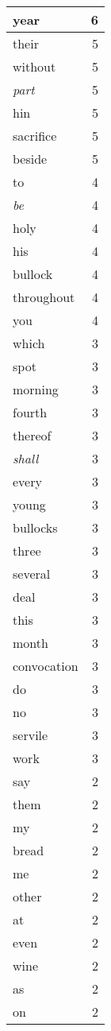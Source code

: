 \begin{center}
\begin{longtable}{l|r}
year & 6\\ \hline 
their & 5\\ \hline 
without & 5\\ \hline 
\emph{part} & 5\\ \hline 
hin & 5\\ \hline 
sacrifice & 5\\ \hline 
beside & 5\\ \hline 
to & 4\\ \hline 
\emph{be} & 4\\ \hline 
holy & 4\\ \hline 
his & 4\\ \hline 
bullock & 4\\ \hline 
throughout & 4\\ \hline 
you & 4\\ \hline 
which & 3\\ \hline 
spot & 3\\ \hline 
morning & 3\\ \hline 
fourth & 3\\ \hline 
thereof & 3\\ \hline 
\emph{shall} & 3\\ \hline 
every & 3\\ \hline 
young & 3\\ \hline 
bullocks & 3\\ \hline 
three & 3\\ \hline 
several & 3\\ \hline 
deal & 3\\ \hline 
this & 3\\ \hline 
month & 3\\ \hline 
convocation & 3\\ \hline 
do & 3\\ \hline 
no & 3\\ \hline 
servile & 3\\ \hline 
work & 3\\ \hline 
say & 2\\ \hline 
them & 2\\ \hline 
my & 2\\ \hline 
bread & 2\\ \hline 
me & 2\\ \hline 
other & 2\\ \hline 
at & 2\\ \hline 
even & 2\\ \hline 
wine & 2\\ \hline 
as & 2\\ \hline 
on & 2\\ \hline 

\end{longtable}
\end{center}
